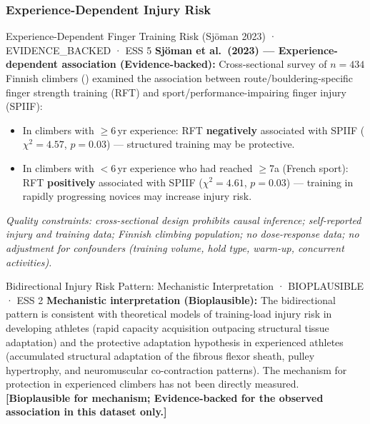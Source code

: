 \subsubsection{Experience-Dependent Injury Risk}

\begin{evidencebox}{Experience-Dependent Finger Training Risk (Sjöman 2023) · EVIDENCE\_BACKED · ESS 5}
\textbf{Sjöman et al.\ (2023) --- Experience-dependent association (Evidence-backed):} Cross-sectional survey of $n=434$ Finnish climbers (\cite{O23}) examined the association between route/bouldering-specific finger strength training (RFT) and sport/performance-impairing finger injury (SPIIF):
\begin{itemize}[leftmargin=1.5em,noitemsep]
  \item In climbers with $\geq$6\,yr experience: RFT \textbf{negatively} associated with SPIIF ($\chi^2=4.57$, $p=0.03$) --- structured training may be protective.
  \item In climbers with $<$6\,yr experience who had reached $\geq$7a (French sport): RFT \textbf{positively} associated with SPIIF ($\chi^2=4.61$, $p=0.03$) --- training in rapidly progressing novices may increase injury risk.
\end{itemize}
\textit{Quality constraints: cross-sectional design prohibits causal inference; self-reported injury and training data; Finnish climbing population; no dose-response data; no adjustment for confounders (training volume, hold type, warm-up, concurrent activities).}
\end{evidencebox}

\begin{bioplausbox}{Bidirectional Injury Risk Pattern: Mechanistic Interpretation · BIOPLAUSIBLE · ESS 2}
\textbf{Mechanistic interpretation (Bioplausible):} The bidirectional pattern is consistent with theoretical models of training-load injury risk in developing athletes (rapid capacity acquisition outpacing structural tissue adaptation) and the protective adaptation hypothesis in experienced athletes (accumulated structural adaptation of the fibrous flexor sheath, pulley hypertrophy, and neuromuscular co-contraction patterns). The mechanism for protection in experienced climbers has not been directly measured. \textbf{[Bioplausible for mechanism; Evidence-backed for the observed association in this dataset only.]}
\end{bioplausbox}

